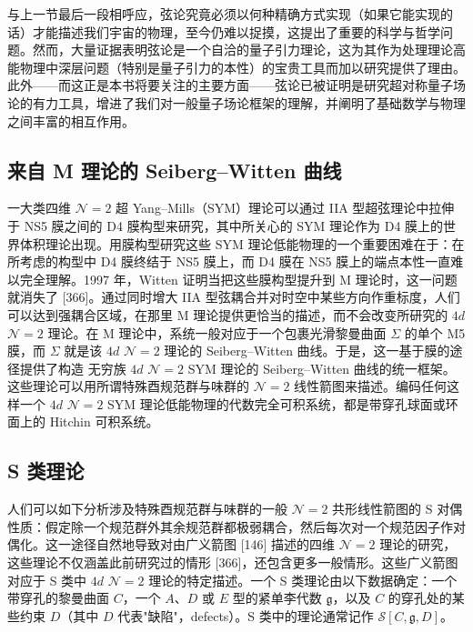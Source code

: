 与上一节最后一段相呼应，弦论究竟必须以何种精确方式实现（如果它能实现的话）才能描述我们宇宙的物理，至今仍难以捉摸，这提出了重要的科学与哲学问题。然而，大量证据表明弦论是一个自洽的量子引力理论，这为其作为处理理论高能物理中深层问题（特别是量子引力的本性）的宝贵工具而加以研究提供了理由。此外——而这正是本书将要关注的主要方面——弦论已被证明是研究超对称量子场论的有力工具，增进了我们对一般量子场论框架的理解，并阐明了基础数学与物理之间丰富的相互作用。

\subsection*{来自 M 理论的 Seiberg--Witten 曲线}

一大类四维 $\mathcal{N}=2$ 超 Yang--Mills（SYM）理论可以通过 IIA 型超弦理论中拉伸于 NS5 膜之间的 D4 膜构型来研究，其中所关心的 SYM 理论作为 D4 膜上的世界体积理论出现。用膜构型研究这些 SYM 理论低能物理的一个重要困难在于：在所考虑的构型中 D4 膜终结于 NS5 膜上，而 D4 膜在 NS5 膜上的端点本性一直难以完全理解。1997 年，Witten 证明当把这些膜构型提升到 M 理论时，这一问题就消失了 [366]。通过同时增大 IIA 型弦耦合并对时空中某些方向作重标度，人们可以达到强耦合区域，在那里 M 理论提供更恰当的描述，而不会改变所研究的 $4d$ $\mathcal{N}=2$ 理论。在 M 理论中，系统一般对应于一个包裹光滑黎曼曲面 $\Sigma$ 的单个 M5 膜，而 $\Sigma$ 就是该 $4d$ $\mathcal{N}=2$ 理论的 Seiberg--Witten 曲线。于是，这一基于膜的途径提供了构造
无穷族 $4d$ $\mathcal{N}=2$ SYM 理论的 Seiberg--Witten 曲线的统一框架。这些理论可以用所谓特殊酉规范群与味群的 $\mathcal{N}=2$ 线性箭图来描述。编码任何这样一个 $4d$ $\mathcal{N}=2$ SYM 理论低能物理的代数完全可积系统，都是带穿孔球面或环面上的 Hitchin 可积系统。

\subsection*{S 类理论}

人们可以如下分析涉及特殊酉规范群与味群的一般 $\mathcal{N}=2$ 共形线性箭图的 S 对偶性质：假定除一个规范群外其余规范群都极弱耦合，然后每次对一个规范因子作对偶化。这一途径自然地导致对由广义箭图 [146] 描述的四维 $\mathcal{N}=2$ 理论的研究，这些理论不仅涵盖此前研究过的情形 [366]，还包含更多一般情形。这些广义箭图对应于 S 类中 $4d$ $\mathcal{N}=2$ 理论的特定描述。一个 S 类理论由以下数据确定：一个带穿孔的黎曼曲面 $C$，一个 $A$、$D$ 或 $E$ 型的紧单李代数 $\mathfrak{g}$，以及 $C$ 的穿孔处的某些约束 $D$（其中 $D$ 代表"缺陷"，defects）。S 类中的理论通常记作 $\mathcal{S}[C,\mathfrak{g},D]$。

